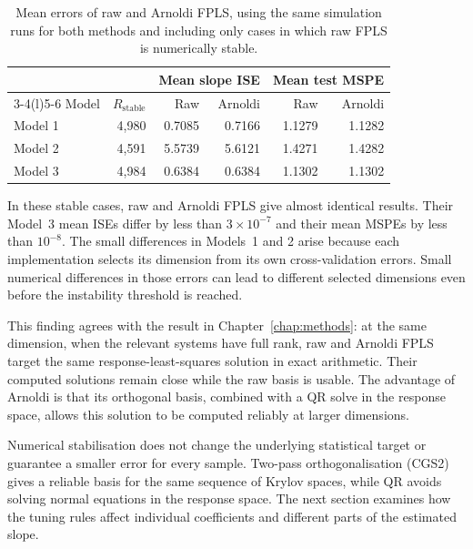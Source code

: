 \begin{table}[htbp]
    \centering
    \small
    \caption[Raw and Arnoldi errors on the paired stable subset]{Mean errors of raw and Arnoldi FPLS, using the same simulation
    runs for both methods and including only cases in which raw FPLS is
    numerically stable.}
    \label{tab:results-stable-pair}
    \begin{tabular}{@{}lrrrrr@{}}
        \toprule
        & & \multicolumn{2}{c}{Mean slope ISE}
          & \multicolumn{2}{c}{Mean test MSPE} \\
        \cmidrule(lr){3-4}\cmidrule(l){5-6}
        Model & $R_{\mathrm{stable}}$ & Raw & Arnoldi & Raw & Arnoldi \\
        \midrule
        Model 1 & 4,980 & 0.7085 & 0.7166 & 1.1279 & 1.1282 \\
        Model 2 & 4,591 & 5.5739 & 5.6121 & 1.4271 & 1.4282 \\
        Model 3 & 4,984 & 0.6384 & 0.6384 & 1.1302 & 1.1302 \\
        \bottomrule
    \end{tabular}
\end{table}

In these stable cases, raw and Arnoldi FPLS give almost identical results.
Their Model~3 mean ISEs differ by less than $3\times10^{-7}$ and their mean
MSPEs by less than $10^{-8}$.  The small differences in Models~1 and 2 arise
because each implementation selects its dimension from its own
cross-validation errors.  Small numerical differences in those errors can
lead to different selected dimensions even before the instability threshold
is reached.

This finding agrees with the result in Chapter~\ref{chap:methods}: at the
same dimension, when the relevant systems have full rank, raw and Arnoldi
FPLS target the same response-least-squares solution in exact arithmetic.
Their computed solutions remain close while the raw basis is usable.  The
advantage of Arnoldi is that its orthogonal basis, combined with a QR solve
in the response space, allows this solution to be computed reliably at
larger dimensions.

Numerical stabilisation does not change the underlying statistical target
or guarantee a smaller error for every sample.  Two-pass orthogonalisation
(CGS2) gives a reliable basis for the same sequence of Krylov spaces, while
QR avoids solving normal equations in the response space.  The next section
examines how the tuning rules affect individual coefficients and different
parts of the estimated slope.


